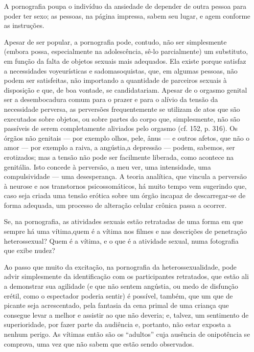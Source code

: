 A pornografia poupa o indivíduo da ansiedade de depender de outra
pessoa para poder ter sexo; as pessoas, na página impressa, sabem seu
lugar, e agem conforme as instruções.

Apesar de ser popular, a pornografia pode, contudo, não ser
simplesmente (embora possa, especialmente na adolescência, sê-lo
parcialmente) um substituto, em função da falta de objetos sexuais mais
adequados. Ela existe porque satisfaz a necessidades voyeurísticas e
sadomasoquistas, que, em algumas pessoas, não podem ser satisfeitas,
não importando a quantidade de parceiros sexuais à disposição e que, de
boa vontade, se candidatariam. Apesar de o orgasmo genital ser a
desembocadura comum para o prazer e para o alívio da tensão da
necessidade perversa, as perversões frequentemente se utilizam de atos
que são executados sobre objetos, ou sobre partes do corpo que,
simplesmente, não são passíveis de serem completamente aliviados pelo
orgasmo (cf. 152, p. 316). Os órgãos não genitais\idxpervorgao{} --- por exemplo
olhos, pele, ânus --- e outros afetos, que não o amor --- por
exemplo a raiva, a angústia,\idxanguporn[|)] a depressão --- podem, sabemos, ser
erotizados; mas a tensão não pode ser facilmente liberada, como
acontece na genitália. Isto concede à perversão, a meu ver, uma
intensidade, uma compulsividade --- uma desesperança. A teoria
analítica, que vincula a perversão à neurose e aos transtornos
psicossomáticos,\idxpsicss{} há muito tempo vem sugerindo que, caso seja criada uma
tensão erótica sobre um órgão incapaz de descarregar-se de forma
adequada, um processo de alteração celular crônica passa a ocorrer.\idxpornoangu[|)]

Se, na pornografia, as atividades sexuais estão retratadas de uma
forma em que sempre há uma vítima,\idxpornoviti[|(] quem é a vítima nos filmes e nas
descrições de penetração heterossexual? Quem é a vítima, e o que é a
atividade sexual, numa fotografia que exibe nudez?


Ao passo que muito da excitação, na pornografia da
heterossexualidade, pode advir simplesmente da identificação com os
participantes retratados, que estão ali a demonstrar sua agilidade (e
que não sentem angústia, ou medo de disfunção erétil, como o espectador
poderia sentir) é possível, também, que um que de picante seja
acrescentado, pela fantasia da cena primal de uma criança que consegue
levar a melhor e assistir ao que não deveria; e, talvez, um sentimento
de superioridade, por fazer parte da audiência e, portanto, não estar
exposta a nenhum perigo. As vítimas então são os
``adultos'' cuja ausência de onipotência se
comprova, uma vez que não sabem que estão sendo observados.


